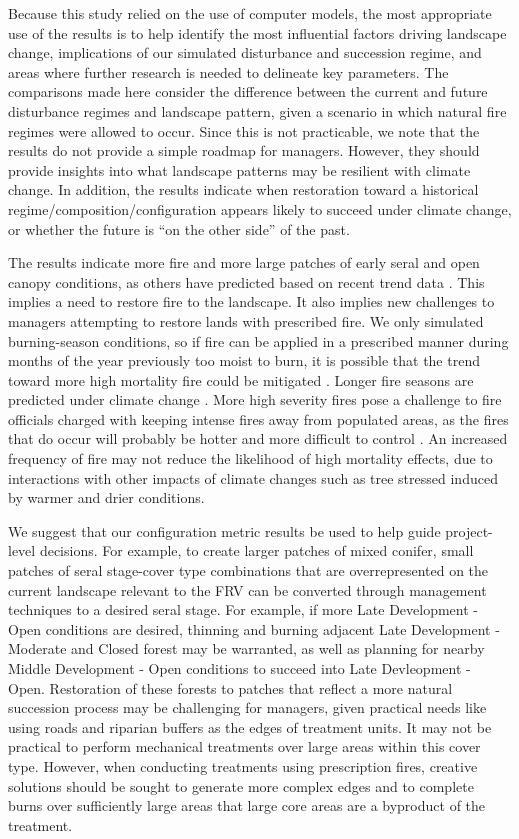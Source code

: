 \documentclass[12pt]{article}
\begin{document}
\begin{spacing}{1}
Because this study relied on the use of computer models, the most appropriate use of the results is to help identify the most influential factors driving landscape change, implications of our simulated disturbance and succession regime, and areas where further research is needed to delineate key parameters. The comparisons made here consider the difference between the current and future disturbance regimes and landscape pattern, given a scenario in which natural fire regimes were allowed to occur. Since this is not practicable, we note that the results do not provide a simple roadmap for managers. However, they should provide insights into what landscape patterns may be resilient with climate change. In addition, the results indicate when restoration toward a historical regime/composition/configuration appears likely to succeed under climate change, or whether the future is ``on the other side'' of the past. 

The results indicate more fire and more large patches of early seral and open canopy conditions, as others have predicted based on recent trend data \citep{Westerling2011,Stephens2013,Miller2012}. This implies a need to restore fire to the landscape. It also implies new challenges to managers attempting to restore lands with prescribed fire. We only simulated burning-season conditions, so if fire can be applied in a prescribed manner during months of the year previously too moist to burn, it is possible that the trend toward more high mortality fire could be mitigated \citep{Schmidt2008,North2012}. Longer fire seasons are predicted under climate change \citep{McKenzie2004}. More high severity fires pose a challenge to fire officials charged with keeping intense fires away from populated areas, as the fires that do occur will probably be hotter and more difficult to control \citep{Schmidt2008}. An increased frequency of fire may not reduce the likelihood of high mortality effects, due to interactions with other impacts of climate changes such as tree stressed induced by warmer and drier conditions.

We suggest that our configuration metric results be used to help guide project-level decisions. For example, to create larger patches of mixed conifer, small patches of seral stage-cover type combinations that are overrepresented on the current landscape relevant to the FRV can be converted through management techniques to a desired seral stage. For example, if more Late Development - Open conditions are desired, thinning and burning adjacent Late Development - Moderate and Closed forest may be warranted, as well as planning for nearby Middle Development - Open conditions to succeed into Late Devleopment - Open. Restoration of these forests to patches that reflect a more natural succession process may be challenging for managers, given practical needs like using roads and riparian buffers as the edges of treatment units. It may not be practical to perform mechanical treatments over large areas within this cover type. However, when conducting treatments using prescription fires, creative solutions should be sought to generate more complex edges and to complete burns over sufficiently large areas that large core areas are a byproduct of the treatment.


\end{spacing}
\end{document}
